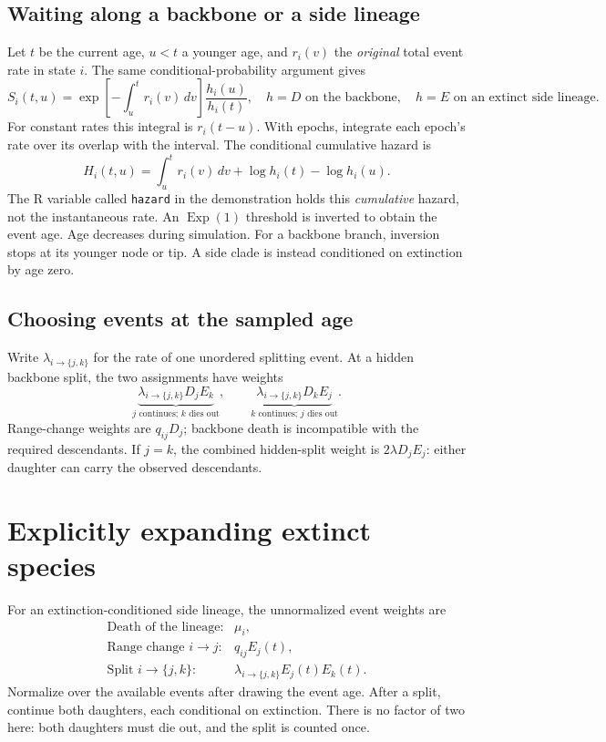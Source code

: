 \documentclass[11pt,a4paper]{article}
\begin{document}
\subsection{Waiting along a backbone or a side lineage}
Let \(t\) be the current age, \(u<t\) a younger age, and \(r_i(v)\) the
\emph{original} total event rate in state \(i\). The same conditional-probability
argument gives
\begin{equation}
S_i(t,u)=\exp\left[-\int_u^t r_i(v)\,dv\right]\frac{h_i(u)}{h_i(t)},
\quad h=D\text{ on the backbone},\quad h=E\text{ on an extinct side lineage}.
\end{equation}
For constant rates this integral is \(r_i(t-u)\). With epochs, integrate each
epoch's rate over its overlap with the interval. The conditional cumulative hazard is
\[
H_i(t,u)=\int_u^t r_i(v)\,dv+\log h_i(t)-\log h_i(u).
\]
The R variable called \texttt{hazard} in the demonstration holds this
\emph{cumulative} hazard, not the instantaneous rate. An \(\operatorname{Exp}(1)\)
threshold is inverted to obtain the event age. Age decreases during simulation.
For a backbone branch, inversion stops at its younger node or tip. A side
clade is instead conditioned on extinction by age zero.

\subsection{Choosing events at the sampled age}
Write \(\lambda_{i\to\{j,k\}}\) for the rate of one unordered splitting
event. At a hidden backbone split, the two assignments have weights
\[
\underbrace{\lambda_{i\to\{j,k\}}D_jE_k}_{j\text{ continues; }k\text{ dies out}},
\qquad
\underbrace{\lambda_{i\to\{j,k\}}D_kE_j}_{k\text{ continues; }j\text{ dies out}}.
\]
Range-change weights are \(q_{ij}D_j\); backbone death is incompatible with
the required descendants. If \(j=k\), the combined hidden-split weight is
\(2\lambda D_jE_j\): either daughter can carry the observed descendants.

\newpage
\section{Explicitly expanding extinct species}
For an extinction-conditioned side lineage, the unnormalized event weights are
\[
\begin{array}{ll}
\text{Death of the lineage:} & \mu_i,\\[2pt]
\text{Range change }i\to j: & q_{ij}E_j(t),\\[2pt]
\text{Split }i\to\{j,k\}: & \lambda_{i\to\{j,k\}}E_j(t)E_k(t).
\end{array}
\]
Normalize over the available events after drawing the event age. After a split,
continue both daughters, each conditional on extinction. There is no factor of
two here: both daughters must die out, and the split is counted once.
\end{document}
